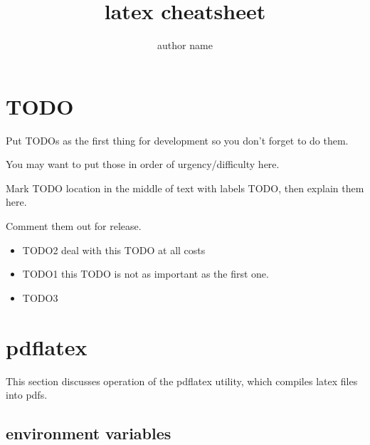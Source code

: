 \documentclass[12pt]{article}
\title{latex cheatsheet}
\author{author name}
\begin{document}
\tableofcontents
\newpage

\section{TODO}

\begin{remark}
    Put TODOs as the first \label{TODO2} thing for development so you don't forget to do them.

    You may want to put those in order of urgency/difficulty here.

    Mark TODO location in \label{TODO1} the middle of text with labels TODO, then explain them here.

    Comment them out for release.
\end{remark}

\begin{itemize}
    \item TODO2 deal with this TODO at all costs
    \item TODO1 this TODO is not as important as the first one.
    \item TODO3
\end{itemize}

\section{pdflatex}

This section discusses operation of the pdflatex utility,
which compiles latex files into pdfs.

\subsection{environment variables}
\end{document}
